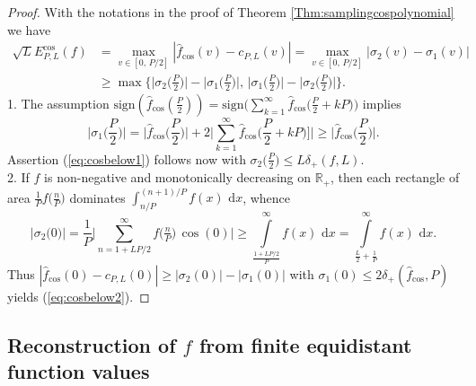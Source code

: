 \documentclass[11pt,a4paper]{scrartcl}
\renewcommand{\d}{\,\mathrm{d}}
\numberwithin{equation}{section}
\numberwithin{table}{section}
\numberwithin{figure}{section}
\newcommand{\sign}{\mathrm{sign}}
\newcommand{\Rp}{{\mathbb R}_{+}}
\newcommand{\fcos}{{\hat f}_{\cos}}
\newcommand{\Ecos}{E^{\cos}}
\begin{document}
\begin{proof}
With the notations in the proof of Theorem \ref{Thm:samplingcospolynomial} we have
\begin{align*} \textstyle \sqrt{L} \Ecos_{P,L}(f) &= \textstyle \max\limits_{v \in [0,\, P/2]} |\fcos(v) - c_{P,L}(v)| = \max\limits_{v \in [0,\, P/2]} |\sigma_2(v) - \sigma_1(v)| \\
&\ge  \textstyle \max\{ \big|\sigma_2\big(\frac{P}{2}\big)\big| - \big|\sigma_1\big(\frac{P}{2}\big)\big|, \,  \big|\sigma_1\big(\frac{P}{2}\big)\big|-\big|\sigma_2\big(\frac{P}{2}\big)\big| \}. \end{align*}
1. The assumption $\sign(\fcos(\frac{P}{2})) = \sign\big(\sum_{k=1}^\infty \fcos\big(\frac{P}{2} +kP\big)\big)$ implies
$$ \textstyle \big| \sigma_1\big(\frac{P}{2}\big) \big|
=  \big|\fcos\big(\frac{P}{2}\big)  \big| +   2\big|\sum\limits_{k =1}^{\infty} \fcos\big(\frac{P}{2} + k P\big)\big]  \big| \ge \big|\fcos\big(\frac{P}{2}\big)  \big|.
$$
Assertion (\ref{eq:cosbelow1})
follows now with $\sigma_2\big(\frac{P}{2}\big) \le L \delta_+(f,L)$.\\
2. If $f$ is non-negative and monotonically decreasing on $\Rp$, then each rectangle of area
$\frac1P f\big(\frac nP\big)$ dominates $\int_{n/P}^{(n+1)/P} f(x)\,\d x$, whence
$$ \textstyle \big|\sigma_2\big(0\big)\big| =
\frac{1}{P}\big|\sum\limits_{n = 1 + LP/2}^{\infty} f\big(\tfrac{n}{P}\big)\,\cos(0)\big|
\ge \int\limits_{\frac{1+LP/2}{P}}^{\infty} f(x) \, \d x
= \int\limits_{\frac{L}{2}+\frac{1}{P}}^{\infty} f(x)\,\d x. $$
Thus $|\fcos(0) - c_{P,L}(0)| \ge  |\sigma_2(0)| - |\sigma_1(0)|$
 with $\sigma_1(0) \le 2 \delta_+(\fcos,P)$ yields (\ref{eq:cosbelow2}).
\end{proof}

\subsection{Reconstruction of $f$ from finite equidistant function values}
\label{sec:recon}
\end{document}

